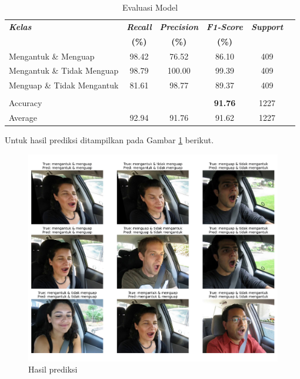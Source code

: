         \begin{table}[H]
        \centering
        \caption{Evaluasi Model}
        \begin{tabular}{lccccc}
            \toprule
            \textbf{\textit{Kelas}} & \textbf{\textit{Recall}} & \textbf{\textit{Precision}} &\textbf{\textit{F1-Score}} & \textbf{\textit{Support }}\\
            
              & \textbf{(\%)} & \textbf{(\%)} & \textbf{(\%)} \\
            \midrule
            Mengantuk \& Menguap & 98.42 & 76.52 & 86.10 & 409 \\
            Mengantuk \& Tidak Menguap & 98.79 & 100.00 & 99.39 & 409 \\
            Menguap \& Tidak Mengantuk & 81.61 & 98.77 & 89.37 & 409 \\ \hline
            & & & & \\
            Accuracy & & & \textbf{91.76} & 1227 \\
            Average & 92.94 & 91.76 & 91.62 & 1227 \\
      
          
             \bottomrule
        \end{tabular}
        \label{Evaluasi Model}
    \end{table}

    Untuk hasil prediksi ditampilkan pada Gambar \ref{hasil prediksi} berikut.
         
          \begin{figure}[H]
              \centering
              \includegraphics[width=1.0\linewidth]{figures/bab4/hasil_prediksi.png}
              \caption{Hasil prediksi}
              \label{hasil prediksi}
          \end{figure}

